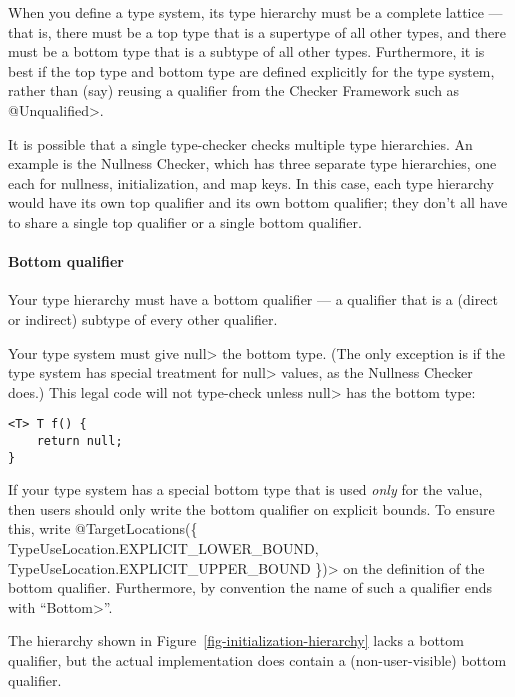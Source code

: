 When you define a type system, its type hierarchy must be a
complete lattice --- that is, there must be a top type that is a
supertype of all other types, and there must be a bottom type that is a
subtype of all other types.
Furthermore, it is best if the top type and bottom type are defined
explicitly for the type system, rather than (say) reusing a qualifier from the
Checker Framework such as \<@Unqualified>.

It is possible that a single type-checker checks multiple type hierarchies.
An example is the Nullness Checker, which has three separate type
hierarchies, one each for
nullness, initialization, and map keys.  In this case, each type hierarchy
would have its own top qualifier and its own bottom qualifier; they don't
all have to share a single top qualifier or a single bottom qualifier.


\paragraph{Bottom qualifier\label{bottom-qualifier}}
Your type hierarchy must have a bottom qualifier
--- a qualifier that is a (direct or indirect) subtype of every other
qualifier.

Your type system must give \<null> the bottom type.  (The only exception
is if the type system has special treatment for \<null> values, as the
Nullness Checker does.)  This legal code
will not type-check unless \<null> has the bottom type:
\begin{Verbatim}
<T> T f() {
    return null;
}
\end{Verbatim}


If your type system has a special bottom type that is used \emph{only} for
the  value, then users should only write the bottom qualifier
on explicit bounds.  To ensure this, write
\<@TargetLocations(\{ TypeUseLocation.EXPLICIT\_LOWER\_BOUND, TypeUseLocation.EXPLICIT\_UPPER\_BOUND \})>
on the definition of the bottom qualifier.
Furthermore, by convention the name of such a qualifier ends with ``\<Bottom>''.

The hierarchy shown in Figure~\ref{fig-initialization-hierarchy} lacks
a bottom qualifier, but the actual implementation does contain a (non-user-visible) bottom qualifier.


